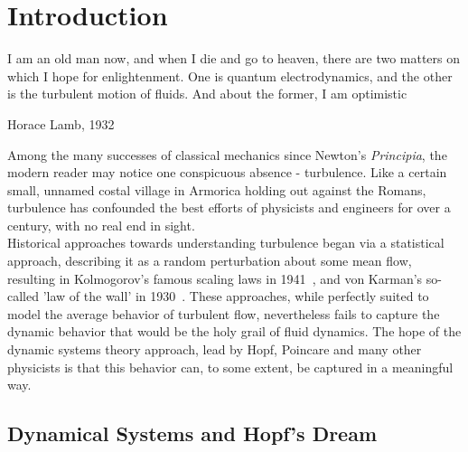 		
\chapter*{Introduction}
\epigraph{ I am an old man now, and when I die and go to heaven, there are two matters on which I hope for enlightenment. One is quantum electrodynamics, and the other is the turbulent motion of fluids. And about the former, I am optimistic}{Horace Lamb, 1932}
	Among the many successes of classical mechanics since Newton's \emph{Principia}, the modern reader may notice one conspicuous absence -  turbulence. Like a certain small, unnamed costal village in Armorica holding out against the Romans, turbulence has confounded the best efforts of physicists and engineers for over a century, with no real end in sight. \\
	
	Historical approaches towards understanding turbulence began via a statistical approach, describing it as a random perturbation about some mean flow, resulting in Kolmogorov's famous scaling laws in 1941~\cite{Kolmogorov1991}, and von Karman's so-called 'law of the wall' in 1930~\cite{Karman1930}. These approaches, while perfectly suited to model the average behavior of turbulent flow, nevertheless fails to capture the dynamic behavior that would be the holy grail of fluid dynamics. The hope of the dynamic systems theory approach, lead by Hopf, Poincare and many other physicists is that this behavior can, to some extent, be captured in a meaningful way. 
	
	\section{Dynamical Systems and Hopf's Dream} 
	
